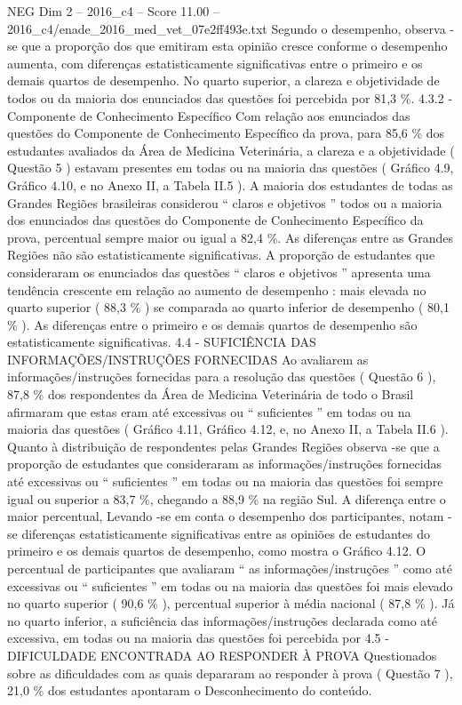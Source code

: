 \begin{textsample}{NEG Dim 2 – 2016\_c4 – Score 11.00 – 2016\_c4/enade\_2016\_med\_vet\_07e2ff493e.txt}
Segundo o desempenho, observa -se que a proporção dos que emitiram esta opinião cresce conforme o desempenho aumenta, com diferenças estatisticamente significativas entre o primeiro e os demais quartos de desempenho.
No quarto superior, a clareza e objetividade de todos ou da maioria dos enunciados das questões foi percebida por 81,3 \%. 4.3.2 - Componente de Conhecimento Específico Com relação aos enunciados das questões do Componente de Conhecimento Específico da prova, para 85,6 \% dos estudantes avaliados da Área de Medicina Veterinária, a clareza e a objetividade ( Questão 5 ) estavam presentes em todas ou na maioria das questões ( Gráfico 4.9, Gráfico 4.10, e no Anexo II, a Tabela II.5 ).
A maioria dos estudantes de todas as Grandes Regiões brasileiras considerou “ claros e objetivos ” todos ou a maioria dos enunciados das questões do Componente de Conhecimento Específico da prova, percentual sempre maior ou igual a 82,4 \%.
As diferenças entre as Grandes Regiões não são estatisticamente significativas.
A proporção de estudantes que consideraram os enunciados das questões “ claros e objetivos ” apresenta uma tendência crescente em relação ao aumento de desempenho : mais elevada no quarto superior ( 88,3 \% ) se comparada ao quarto inferior de desempenho ( 80,1 \% ).
As diferenças entre o primeiro e os demais quartos de desempenho são estatisticamente significativas. 4.4 - SUFICIÊNCIA DAS INFORMAÇÕES/INSTRUÇÕES FORNECIDAS Ao avaliarem as informações/instruções fornecidas para a resolução das questões ( Questão 6 ), 87,8 \% dos respondentes da Área de Medicina Veterinária de todo o Brasil afirmaram que estas eram até excessivas ou “ suficientes ” em todas ou na maioria das questões ( Gráfico 4.11, Gráfico 4.12, e, no Anexo II, a Tabela II.6 ).
Quanto à distribuição de respondentes pelas Grandes Regiões observa -se que a proporção de estudantes que consideraram as informações/instruções fornecidas até excessivas ou “ suficientes ” em todas ou na maioria das questões foi sempre igual ou superior a 83,7 \%, chegando a 88,9 \% na região Sul.
A diferença entre o maior percentual, Levando -se em conta o desempenho dos participantes, notam -se diferenças estatisticamente significativas entre as opiniões de estudantes do primeiro e os demais quartos de desempenho, como mostra o Gráfico 4.12.
O percentual de participantes que avaliaram “ as informações/instruções ” como até excessivas ou “ suficientes ” em todas ou na maioria das questões foi mais elevado no quarto superior ( 90,6 \% ), percentual superior à média nacional ( 87,8 \% ).
Já no quarto inferior, a suficiência das informações/instruções declarada como até excessiva, em todas ou na maioria das questões foi percebida por 4.5 - DIFICULDADE ENCONTRADA AO RESPONDER À PROVA Questionados sobre as dificuldades com as quais depararam ao responder à prova ( Questão 7 ), 21,0 \% dos estudantes apontaram o Desconhecimento do conteúdo.

\end{textsample}
